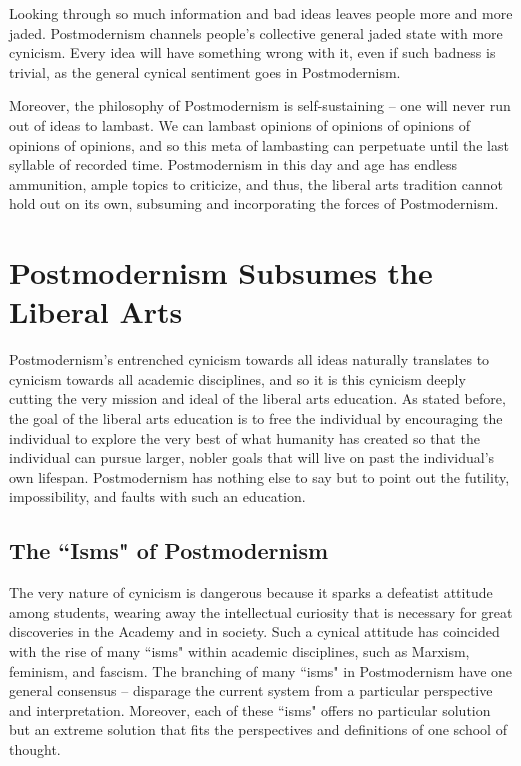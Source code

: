 \documentclass[12pt,letterpaper]{article}
\begin{document}
Looking through so much information and bad ideas leaves people more and more jaded.  Postmodernism channels people's collective general jaded state with more cynicism.  Every idea will have something wrong with it, even if such badness is trivial, as the general cynical sentiment goes in Postmodernism.  

Moreover, the philosophy of Postmodernism is self-sustaining -- one will never run out of ideas to lambast. We can lambast opinions of opinions of opinions of opinions of opinions, and so this meta of lambasting can perpetuate until the last syllable of recorded time.  Postmodernism in this day and age has endless ammunition, ample topics to criticize, and thus, the liberal arts tradition cannot hold out on its own, subsuming and incorporating the forces of Postmodernism.

%

\section{Postmodernism Subsumes the Liberal Arts}

Postmodernism's entrenched cynicism towards all ideas naturally translates to cynicism towards all academic disciplines, and so it is this cynicism deeply cutting the very mission and ideal of the liberal arts education.  As stated before, the goal of the liberal arts education is to free the individual by encouraging the individual to explore the very best of what humanity has created so that the individual can pursue larger, nobler goals that will live on past the individual's own lifespan.  Postmodernism has nothing else to say but to point out the futility, impossibility, and faults with such an education.

\subsection{The ``Isms" of Postmodernism}
The very nature of cynicism is dangerous because it sparks a defeatist attitude among students, wearing away the intellectual curiosity that is necessary for great discoveries in the Academy and in society.  Such a cynical attitude has coincided with the rise of many ``isms" within academic disciplines, such as Marxism, feminism, and fascism. The branching of many ``isms" in Postmodernism have one general consensus  -- disparage the current system from a particular perspective and interpretation.  Moreover, each of these ``isms" offers no particular solution but an extreme solution that fits the perspectives and definitions of one school of thought.
\end{document}
